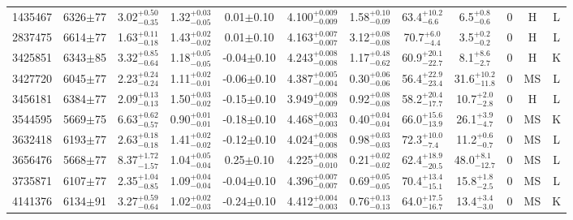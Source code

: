 \begin{landscape}
\begin{longtable}{c|ccccc|ccc|ccc}
	1435467 & 6326$\pm$77    & 3.02$_{-0.35}^{+0.50}$    & 1.32$_{-0.05}^{+0.03}$ & 0.01$\pm$0.10     & 4.100$_{-0.009}^{+0.009}$ & 1.58$_{-0.09}^{+0.10}$ & 63.4$_{-6.6}^{+10.2}$     & 6.5$_{-0.6}^{+0.8}$      & 0 &        H & L \\
	2837475 & 6614$\pm$77    & 1.63$_{-0.18}^{+0.11}$    & 1.43$_{-0.02}^{+0.02}$ & 0.01$\pm$0.10     & 4.163$_{-0.007}^{+0.007}$ & 3.12$_{-0.08}^{+0.08}$ & 70.7$_{-4.4}^{+6.0}$      & 3.5$_{-0.2}^{+0.2}$      & 0 &        H & L \\
	3425851 & 6343$\pm$85    & 3.32$_{-0.64}^{+0.85}$    & 1.18$_{-0.05}^{+0.05}$ & -0.04$\pm$0.10    & 4.243$_{-0.008}^{+0.008}$ & 1.17$_{-0.62}^{+0.48}$ & 60.9$_{-22.7}^{+20.1}$    & 8.1$_{-2.7}^{+8.6}$      & 0 &        H & K \\
	3427720 & 6045$\pm$77    & 2.23$_{-0.24}^{+0.24}$    & 1.11$_{-0.01}^{+0.02}$ & -0.06$\pm$0.10    & 4.387$_{-0.004}^{+0.005}$ & 0.30$_{-0.06}^{+0.06}$ & 56.4$_{-23.4}^{+22.9}$    & 31.6$_{-11.8}^{+10.2}$   & 0 &        MS & L \\
	3456181 & 6384$\pm$77    & 2.09$_{-0.13}^{+0.13}$    & 1.50$_{-0.02}^{+0.03}$ & -0.15$\pm$0.10    & 3.949$_{-0.009}^{+0.008}$ & 0.92$_{-0.08}^{+0.08}$ & 58.2$_{-17.7}^{+20.4}$    & 10.7$_{-2.8}^{+2.0}$     & 0 &        H & L \\
	3544595 & 5669$\pm$75    & 6.63$_{-0.57}^{+0.62}$    & 0.90$_{-0.01}^{+0.01}$ & -0.18$\pm$0.10    & 4.468$_{-0.003}^{+0.003}$ & 0.40$_{-0.04}^{+0.04}$ & 66.0$_{-13.9}^{+15.6}$    & 26.1$_{-4.7}^{+3.9}$     & 0 &        MS & K \\
	3632418 & 6193$\pm$77    & 2.63$_{-0.18}^{+0.18}$    & 1.41$_{-0.02}^{+0.02}$ & -0.12$\pm$0.10    & 4.024$_{-0.008}^{+0.008}$ & 0.98$_{-0.03}^{+0.03}$ & 72.3$_{-7.4}^{+10.0}$     & 11.2$_{-0.7}^{+0.6}$     & 0 &        MS & L \\
	3656476 & 5668$\pm$77    & 8.37$_{-1.57}^{+1.72}$    & 1.04$_{-0.04}^{+0.05}$ & 0.25$\pm$0.10     & 4.225$_{-0.010}^{+0.008}$ & 0.21$_{-0.02}^{+0.02}$ & 62.4$_{-20.5}^{+18.9}$    & 48.0$_{-12.7}^{+8.1}$    & 0 &        MS & L \\
	3735871 & 6107$\pm$77    & 2.35$_{-0.85}^{+1.04}$    & 1.09$_{-0.04}^{+0.04}$ & -0.04$\pm$0.10    & 4.396$_{-0.007}^{+0.007}$ & 0.69$_{-0.05}^{+0.05}$ & 70.4$_{-15.1}^{+13.4}$    & 15.8$_{-2.5}^{+1.8}$     & 0 &        MS & L \\
	4141376 & 6134$\pm$91    & 3.27$_{-0.64}^{+0.59}$    & 1.02$_{-0.03}^{+0.02}$ & -0.24$\pm$0.10    & 4.412$_{-0.003}^{+0.004}$ & 0.76$_{-0.13}^{+0.13}$ & 64.0$_{-16.7}^{+17.5}$    & 13.4$_{-3.0}^{+3.4}$     & 0 &        MS & K \\

\end{longtable}
\end{landscape}
